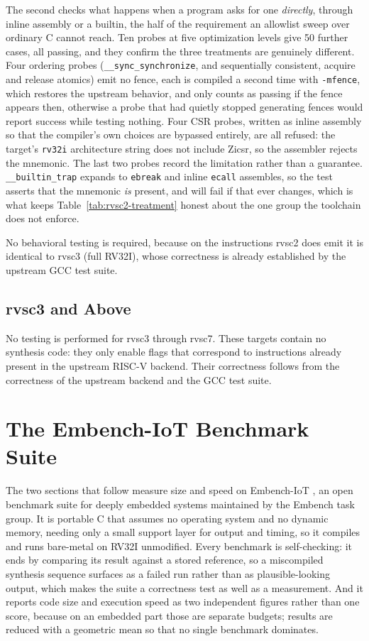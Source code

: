 The second checks what happens when a program asks for one \textit{directly}, through inline assembly
or a builtin, the half of the requirement an allowlist sweep over ordinary C cannot reach. Ten
probes at five optimization levels give 50 further cases, all passing, and they confirm the three
treatments are genuinely different. Four ordering probes (\texttt{\_\_sync\_synchronize}, and
sequentially consistent, acquire and release atomics) emit no fence, each is compiled a second time
with \texttt{-mfence}, which restores the upstream behavior, and only counts as passing if the fence
appears then, otherwise a probe that had quietly stopped generating fences would report success
while testing nothing. Four CSR probes, written as inline assembly so that the compiler's own choices
are bypassed entirely, are all refused: the target's \texttt{rv32i} architecture string does not
include Zicsr, so the assembler rejects the mnemonic. The last two probes record the limitation rather
than a guarantee. \texttt{\_\_builtin\_trap} expands to \texttt{ebreak} and inline \texttt{ecall}
assembles, so the test asserts that the mnemonic \textit{is} present, and will fail if that ever
changes, which is what keeps Table~\ref{tab:rvsc2-treatment} honest about the one group the
toolchain does not enforce.

No behavioral testing is required, because on the instructions rvsc2 does emit it is identical to
rvsc3 (full RV32I), whose correctness is already established by the upstream GCC test suite.

\subsection{rvsc3 and Above}

No testing is performed for rvsc3 through rvsc7. These targets contain no synthesis code: they only
enable flags that correspond to instructions already present in the upstream RISC-V backend. Their
correctness follows from the correctness of the upstream backend and the GCC test suite.

\section{The Embench-IoT Benchmark Suite} \label{sec:embench-suite}

The two sections that follow measure size and speed on Embench-IoT \cite{embench}, an open benchmark
suite for deeply embedded systems maintained by the Embench task group.
It is portable C that assumes no operating system and no dynamic memory, needing only a small
support layer for output and timing, so it compiles and runs bare-metal on RV32I unmodified. Every
benchmark is self-checking: it ends by comparing its result against a stored reference, so a
miscompiled synthesis sequence surfaces as a failed run rather than as plausible-looking output,
which makes the suite a correctness test as well as a measurement. And it reports code size and
execution speed as two independent figures rather than one score, because on an embedded part those
are separate budgets; results are reduced with a geometric mean so that no single benchmark dominates.

